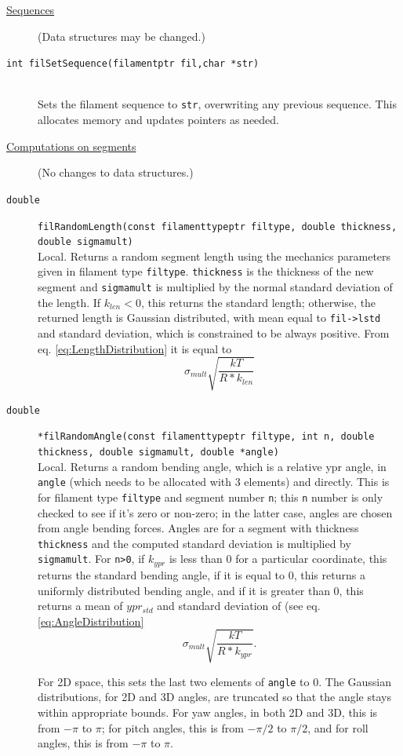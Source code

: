 \documentclass {scrbook}
\newcommand {\ttt} {\texttt}
\begin{document}
\begin{description}
\item[\underline{Sequences}]
(Data structures may be changed.)

\item[\ttt{int filSetSequence(filamentptr fil,char *str)}]
\hfill \\
Sets the filament sequence to \ttt{str}, overwriting any previous sequence. This allocates memory and updates pointers as needed.


\item[\underline{Computations on segments}]
(No changes to data structures.)

\item[\ttt{double}]
\ttt{filRandomLength(const filamenttypeptr filtype, double thickness, double sigmamult)}
\hfill \\
Local. Returns a random segment length using the mechanics parameters given in filament type \ttt{filtype}. \ttt{thickness} is the thickness of the new segment and \ttt{sigmamult} is multiplied by the normal standard deviation of the length. If $k_{len} < 0$, this returns the standard length; otherwise, the returned length is Gaussian distributed, with mean equal to \ttt{fil->lstd} and standard deviation, which is constrained to be always positive. From eq. \ref{eq:LengthDistribution} it is equal to
$$\sigma_{mult}\sqrt{\frac{kT}{R*k_{len}}}$$

\item[\ttt{double}]
\ttt{*filRandomAngle(const filamenttypeptr filtype, int n, double thickness, double sigmamult, double *angle)}
\hfill \\
Local. Returns a random bending angle, which is a relative ypr angle, in \ttt{angle} (which needs to be allocated with 3 elements) and directly. This is for filament type \ttt{filtype} and segment number \ttt{n}; this \ttt{n} number is only checked to see if it's zero or non-zero; in the latter case, angles are chosen from angle bending forces. Angles are for a segment with thickness \ttt{thickness} and the computed standard deviation is multiplied by \ttt{sigmamult}. For \ttt{n>0}, if $k_{ypr}$ is less than 0 for a particular coordinate, this returns the standard bending angle, if it is equal to 0, this returns a uniformly distributed bending angle, and if it is greater than 0, this returns a mean of $ypr_{std}$ and standard deviation of (see eq. \ref{eq:AngleDistribution}
$$\sigma_{mult} \sqrt{\frac{kT}{R*k_{ypr}}}.$$

For 2D space, this sets the last two elements of \ttt{angle} to 0. The Gaussian distributions, for 2D and 3D angles, are truncated so that the angle stays within appropriate bounds. For yaw angles, in both 2D and 3D, this is from $-\pi$ to $\pi$; for pitch angles, this is from $-\pi/2$ to $\pi/2$, and for roll angles, this is from $-\pi$ to $\pi$.


\end{description}
\end{document}
